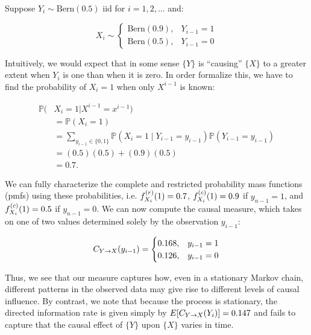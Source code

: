 \begin{example}
Suppose $Y_i \sim \text{Bern}(0.5)$ iid for $i=1,2,\dots$ and:

\begin{equation}
X_i \sim
\begin{cases}
      \text{Bern}(0.9), & Y_{i-1} = 1 \\
      \text{Bern}(0.5), & Y_{i-1} = 0
\end{cases}
\end{equation}

\noindent Intuitively, we would expect that in some sense $\{Y\}$ is ``causing'' $\{X\}$ to a greater extent when $Y_i$ is one than when it is zero. In order formalize this, we have to find the probability of $X_i=1$ when only $X^{i-1}$ is known:

\begin{equation*}
\begin{aligned}
\mathbb{P}(&X_i = 1 | X^{i-1}=x^{i-1}) \\
&= \mathbb{P}(X_i = 1) \\
&= \sum_{y_{i-1}\in \{0,1\}}
    \mathbb{P}(X_i =1 \mid Y_{i-1} = y_{i-1}) \mathbb{P}(Y_{i-1} = y_{i-1}) \\
&= (0.5)(0.5) + (0.9)(0.5) \\
&= 0.7.
\end{aligned}
\end{equation*}

\noindent We can fully characterize the complete and restricted probability mass functions (pmfs) using these probabilities, i.e. $f_{X_i}^{(r)}(1) = 0.7$, $f_{X_i}^{(c)}(1) = 0.9$ if $y_{n-1}=1$, and $f_{X_i}^{(c)}(1) = 0.5$ if $y_{n-1}=0$. We can now compute the causal measure, which takes on one of two values determined solely by the observation $y_{i-1}$:

\begin{equation}
C_{Y\rightarrow X}(y_{i-1}) =
\begin{cases}
      0.168, & y_{i-1} = 1 \\
      0.126, & y_{i-1} = 0
\end{cases}
\end{equation}

\noindent Thus, we see that our measure captures how, even in a stationary Markov chain, different patterns in the observed data may give rise to different levels of causal influence. By contrast, we note that because the process is stationary, the directed information rate is given simply by $E[C_{Y\rightarrow X}(Y_i)]=0.147$ and fails to capture that the causal effect of $\{Y\}$ upon $\{X\}$ varies in time.
\end{example}

